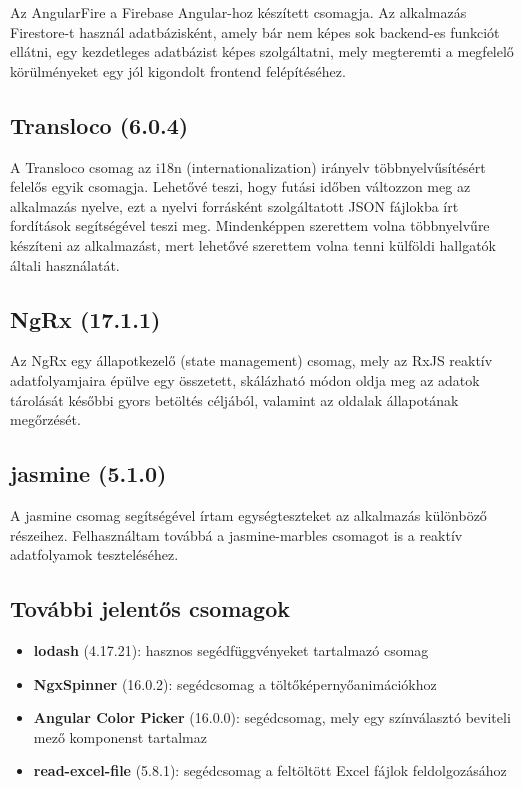 \documentclass[a4paper,12pt]{report}
\begin{document}
Az AngularFire a Firebase Angular-hoz készített csomagja. Az alkalmazás Firestore-t használ adatbázisként, amely bár nem képes sok backend-es funkciót ellátni, egy kezdetleges adatbázist képes szolgáltatni, mely megteremti a megfelelő körülményeket egy jól kigondolt frontend felépítéséhez.

\subsection{Transloco (6.0.4)}

A Transloco csomag az i18n (internationalization) irányelv többnyelvűsítésért felelős egyik csomagja. Lehetővé teszi, hogy futási időben változzon meg az alkalmazás nyelve, ezt a nyelvi forrásként szolgáltatott JSON fájlokba írt fordítások segítségével teszi meg. Mindenképpen szerettem volna többnyelvűre készíteni az alkalmazást, mert lehetővé szerettem volna tenni külföldi hallgatók általi használatát.

\subsection{NgRx (17.1.1)}

Az NgRx \cite{ngrx-store} egy állapotkezelő (state management) csomag, mely az RxJS reaktív adatfolyamjaira épülve egy összetett, skálázható módon oldja meg az adatok tárolását későbbi gyors betöltés céljából, valamint az oldalak állapotának megőrzését.

\subsection{jasmine (5.1.0)}

A jasmine csomag segítségével írtam egységteszteket az alkalmazás különböző részeihez. Felhasználtam továbbá a jasmine-marbles csomagot is a reaktív adatfolyamok teszteléséhez.

\subsection{További jelentős csomagok}

\begin{itemize}
    \item \textbf{lodash} (4.17.21): hasznos segédfüggvényeket tartalmazó csomag
    \item \textbf{NgxSpinner} (16.0.2): segédcsomag a töltőképernyőanimációkhoz
    \item \textbf{Angular Color Picker} (16.0.0): segédcsomag, mely egy színválasztó beviteli mező komponenst tartalmaz
    \item \textbf{read-excel-file} (5.8.1): segédcsomag a feltöltött Excel fájlok feldolgozásához
\end{itemize}
\end{document}

